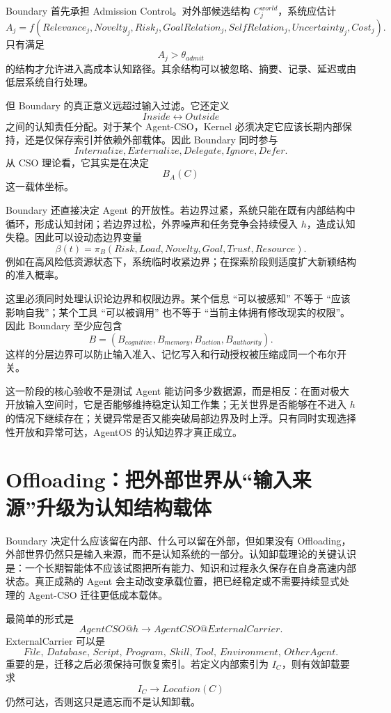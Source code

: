 Boundary 首先承担 Admission Control。对外部候选结构 $C_j^{world}$，系统应估计
\[
A_j
=
f(
Relevance_j,
Novelty_j,
Risk_j,
GoalRelation_j,
SelfRelation_j,
Uncertainty_j,
Cost_j
).
\]
只有满足
\[
A_j>\theta_{admit}
\]
的结构才允许进入高成本认知路径。其余结构可以被忽略、摘要、记录、延迟或由低层系统自行处理。

但 Boundary 的真正意义远超过输入过滤。它还定义
\[
Inside
\leftrightarrow
Outside
\]
之间的认知责任分配。对于某个 Agent-CSO，Kernel 必须决定它应该长期内部保持，还是仅保存索引并依赖外部载体。因此 Boundary 同时参与
\[
Internalize,
Externalize,
Delegate,
Ignore,
Defer.
\]
从 CSO 理论看，它其实是在决定
\[
B_A(C)
\]
这一载体坐标。

Boundary 还直接决定 Agent 的开放性。若边界过紧，系统只能在既有内部结构中循环，形成认知封闭；若边界过松，外界噪声和任务竞争会持续侵入 $h$，造成认知失稳。因此可以设动态边界变量
\[
\beta(t)
=
\pi_B(
Risk,
Load,
Novelty,
Goal,
Trust,
Resource
).
\]
例如在高风险低资源状态下，系统临时收紧边界；在探索阶段则适度扩大新颖结构的准入概率。

这里必须同时处理认识论边界和权限边界。某个信息 ``可以被感知'' 不等于 ``应该影响自我''；某个工具 ``可以被调用'' 也不等于 ``当前主体拥有修改现实的权限''。因此 Boundary 至少应包含
\[
B=
(B_{cognitive},
B_{memory},
B_{action},
B_{authority}).
\]
这样的分层边界可以防止输入准入、记忆写入和行动授权被压缩成同一个布尔开关。

这一阶段的核心验收不是测试 Agent 能访问多少数据源，而是相反：在面对极大开放输入空间时，它是否能够维持稳定认知工作集；无关世界是否能够在不进入 $h$ 的情况下继续存在；关键异常是否又能突破局部边界及时上浮。只有同时实现选择性开放和异常可达，AgentOS 的认知边界才真正成立。

\section{Offloading：把外部世界从“输入来源”升级为认知结构载体}

Boundary 决定什么应该留在内部、什么可以留在外部，但如果没有 Offloading，外部世界仍然只是输入来源，而不是认知系统的一部分。认知卸载理论的关键认识是：一个长期智能体不应该试图把所有能力、知识和过程永久保存在自身高速内部状态。真正成熟的 Agent 会主动改变承载位置，把已经稳定或不需要持续显式处理的 Agent-CSO 迁往更低成本载体。

最简单的形式是
\[
AgentCSO@h
\rightarrow
AgentCSO@ExternalCarrier.
\]
ExternalCarrier 可以是
\[
File,\,
Database,\,
Script,\,
Program,\,
Skill,\,
Tool,\,
Environment,\,
OtherAgent.
\]
重要的是，迁移之后必须保持可恢复索引。若定义内部索引为 $I_C$，则有效卸载要求
\[
I_C
\rightarrow
Location(C)
\]
仍然可达，否则这只是遗忘而不是认知卸载。

